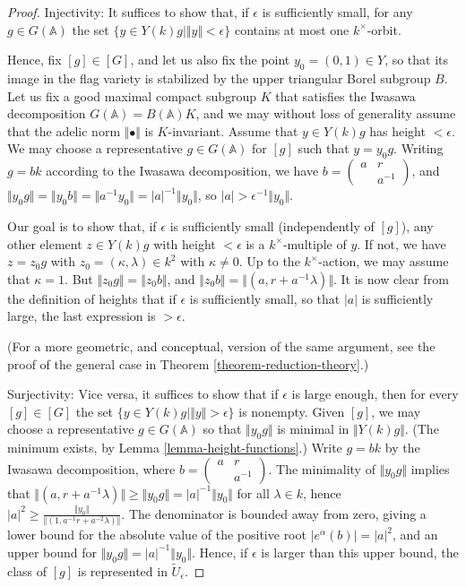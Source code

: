\begin{proof}
 Injectivity: It suffices to show that, if $\epsilon$ is sufficiently small, for any $g\in G(\mathbb A)$ the set $\{y \in Y(k)g| \Vert y\Vert <\epsilon\}$ contains at most one $k^\times$-orbit.
 
 Hence, fix $[g]\in [G]$, and let us also fix the point $y_0 =(0,1)\in Y$, so that its image in the flag variety is stabilized by the upper triangular Borel subgroup $B$. Let us fix a good maximal compact subgroup $K$ that satisfies the Iwasawa decomposition $G(\mathbb A) = B(\mathbb A)K$, and we may without loss of generality assume that the adelic norm $\Vert \bullet \Vert $ is $K$-invariant. Assume that $y\in Y(k)g$ has height $<\epsilon$. We may choose a representative $g\in G(\mathbb A)$ for $[g]$ such that $y = y_0 g$.  
 Writing $g = bk$ according to the Iwasawa decomposition, we have $ b = \begin{pmatrix} a & r \\ & a^{-1}\end{pmatrix}$, and $ \Vert y_0 g\Vert = \Vert y_0 b\Vert = \Vert a^{-1} y_0\Vert = |a|^{-1} \Vert y_0\Vert$, so $|a| > \epsilon^{-1} \Vert y_0\Vert$. 
 
 Our goal is to show that, if $\epsilon$ is sufficiently small (independently of $[g]$), any other element $z\in Y(k)g$ with height $<\epsilon$ is a $k^\times$-multiple of $y$. If not, we have $z = z_0 g$ with $z_0 = (\kappa, \lambda) \in k^2$ with $\kappa\ne 0$. Up to the $k^\times$-action, we may assume that $\kappa=1$. But $\Vert z_0 g\Vert = \Vert z_0 b\Vert$, and $\Vert z_0 b\Vert = \Vert (a , r + a^{-1} \lambda)\Vert$. It is now clear from the definition of heights that if $\epsilon$ is sufficiently small, so that $|a|$ is sufficiently large, the last expression is $>\epsilon$.
 
 (For a more geometric, and conceptual, version of the same argument, see the proof of the general case in Theorem \ref{theorem-reduction-theory}.)
 
 Surjectivity: Vice versa, it suffices to show that if $\epsilon$ is large enough, then for every $[g]\in [G]$ the set $\{y\in Y(k)g | \Vert y\Vert >\epsilon\}$ is nonempty. Given $[g]$, we may choose a representative $g\in G(\mathbb A)$ so that $\Vert y_0 g\Vert$ is minimal in $\Vert Y(k)g\Vert$. (The minimum exists, by Lemma \ref{lemma-height-functions}.) Write $g = bk$ by the Iwasawa decomposition, where $b = \begin{pmatrix} a & r \\ & a^{-1}\end{pmatrix}$. The minimality of $\Vert y_0 g\Vert$ implies that 
 $\Vert (a , r + a^{-1} \lambda)\Vert \ge \Vert y_0 g\Vert = |a|^{-1} \Vert y_0 \Vert$ for all $\lambda\in k$, hence $|a|^2 \ge \frac{\Vert y_0\Vert }{\Vert (1 , a^{-1} r + a^{-2} \lambda)\Vert}$. The denominator is bounded away from zero, giving a lower bound for the absolute value of the positive root $|e^\alpha(b)| = |a|^2$, and an upper bound for $\Vert y_0 g\Vert = |a|^{-1} \Vert y_0 \Vert$. Hence, if $\epsilon$ is larger than this upper bound, the class of $[g]$ is represented in $\tilde U_\epsilon$.
 
 
\end{proof}
